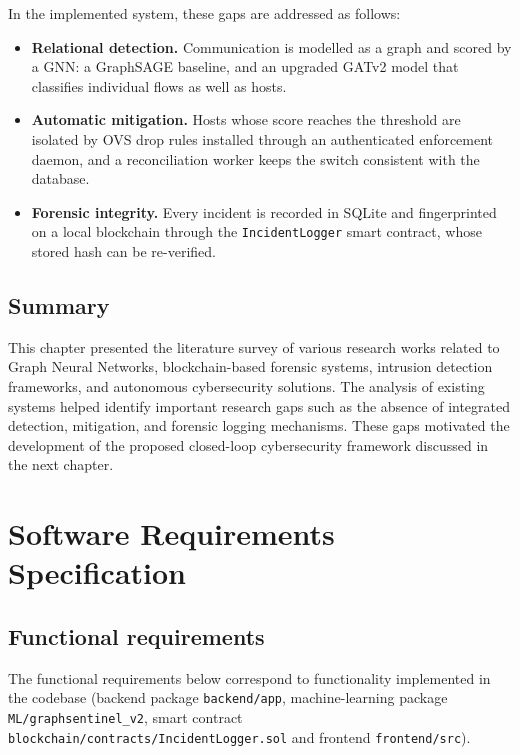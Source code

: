 \documentclass[12pt,a4paper]{report}
\begin{document}
In the implemented system, these gaps are addressed as follows:
\begin{itemize}
    \item \textbf{Relational detection.} Communication is modelled as a graph and scored by a GNN: a GraphSAGE baseline, and an upgraded GATv2 model that classifies individual flows as well as hosts.
    \item \textbf{Automatic mitigation.} Hosts whose score reaches the threshold are isolated by OVS drop rules installed through an authenticated enforcement daemon, and a reconciliation worker keeps the switch consistent with the database.
    \item \textbf{Forensic integrity.} Every incident is recorded in SQLite and fingerprinted on a local blockchain through the \texttt{IncidentLogger} smart contract, whose stored hash can be re-verified.
\end{itemize}


\section{Summary}
This chapter presented the literature survey of various research works related to Graph Neural Networks, blockchain-based forensic systems, intrusion detection frameworks, and autonomous cybersecurity solutions. The analysis of existing systems helped identify important research gaps such as the absence of integrated detection, mitigation, and forensic logging mechanisms. These gaps motivated the development of the proposed closed-loop cybersecurity framework discussed in the next chapter.



\chapter{Software Requirements Specification}

\section{Functional requirements}
The functional requirements below correspond to functionality implemented in the codebase (backend package \texttt{backend/\allowbreak{}app}, machine-learning package \texttt{ML/\allowbreak{}graphsentinel\_\allowbreak{}v2}, smart contract \texttt{blockchain/\allowbreak{}contracts/\allowbreak{}IncidentLogger.\allowbreak{}sol} and frontend \texttt{frontend/\allowbreak{}src}).
\end{document}
